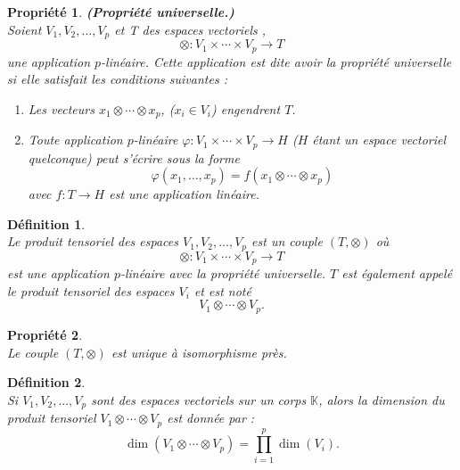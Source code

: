 \documentclass[a4paper, 14pt]{report}
\newtheorem{definition}{Définition}[section]
\newtheorem{propriety}{Propriété}[section]
\begin{document}
\begin{onehalfspace}
{			\begin{propriety}\textbf{(Propriété universelle.)} \cite{greub2012linear}\\
				Soient \( V_1, V_2, ... ,V_p \) et T des espaces vectoriels , 
				\[
				\otimes : V_1 \times \cdots \times V_p \to T
				\]
				une application \( p \)-linéaire. Cette application est dite avoir la \textit{propriété universelle} si elle satisfait les conditions suivantes :
				\begin{enumerate} [label=\roman*)]
					\item Les vecteurs \( x_1 \otimes \cdots \otimes x_p \), (\( x_i \in V_i \)) engendrent \( T \).
					\item Toute application \( p \)-linéaire \( \varphi : V_1 \times \cdots \times V_p \to H \) (\( H \) étant un espace vectoriel quelconque) peut s'écrire sous la forme
					\[
					\varphi(x_1, \ldots, x_p) = f(x_1 \otimes \cdots \otimes x_p)
					\]
					avec \( f : T \to H \) est une application linéaire.
				\end{enumerate}
			\end{propriety}
			
			\begin{definition} \cite{greub2012linear}\\
				Le produit tensoriel des espaces \( V_1, V_2, ... ,V_p \) est un couple \( (T, \otimes) \) où
				\[
				\otimes : V_1 \times \cdots \times V_p \to T
				\]
				est une application \( p \)-linéaire avec la propriété universelle. \( T \) est également appelé le produit tensoriel des espaces \( V_i \) et est noté
				\[
				V_1 \otimes \cdots \otimes V_p.
				\]
			\end{definition}
			
			\begin{propriety} \cite{greub2012linear}\\
				Le couple \( (T, \otimes) \) est unique à isomorphisme près.
			\end{propriety}
			
			
			\begin{definition} \cite{greub2012linear}\\
				Si \( V_1, V_2, ... ,V_p \) sont des espaces vectoriels sur un corps \( \mathbb{K} \), alors la dimension du produit tensoriel \( V_1 \otimes \cdots \otimes V_p \) est donnée par :
				\[
				\dim(V_1 \otimes \cdots \otimes V_p) = \prod_{i=1}^p \dim(V_i).
				\]
			\end{definition}
			
			
			
}
\end{onehalfspace}
\end{document}
